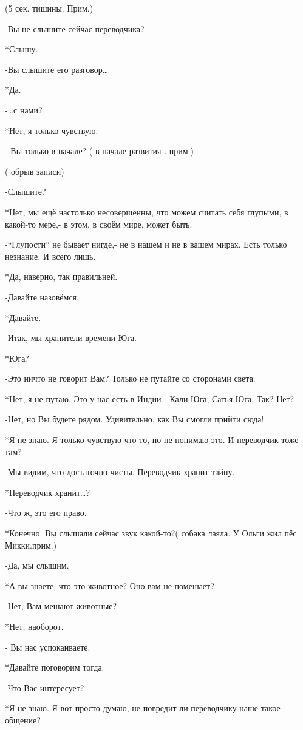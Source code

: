  (5 сек. тишины. Прим.)

-Вы не слышите сейчас переводчика?

*Слышу.

-Вы слышите его разговор… 

*Да.

-…с нами?

*Нет, я только чувствую.

- Вы только в начале? ( в начале развития . прим.)

( обрыв записи)

-Слышите?

*Нет, мы ещё настолько несовершенны, что можем считать себя глупыми, в какой-то мере,- в этом, в своём мире, может быть.

-“Глупости” не бывает нигде,-  не в нашем и не в вашем мирах. Есть только незнание. И всего лишь.

*Да, наверно, так правильней.

-Давайте назовёмся.

*Давайте.

-Итак, мы хранители времени Юга.

*Юга?

-Это ничто не говорит Вам? Только не путайте со сторонами света.

*Нет, я не путаю. Это у нас есть в Индии - Кали Юга, Сатья Юга. Так? Нет?

-Нет, но Вы будете рядом. Удивительно, как Вы смогли прийти сюда!

*Я не знаю. Я только чувствую что то, но не понимаю это. И переводчик тоже там?

-Мы видим, что достаточно чисты. Переводчик хранит тайну.

*Переводчик хранит…?

-Что ж, это его право.

*Конечно. Вы слышали сейчас звук какой-то?( собака лаяла. У Ольги жил пёс Микки.прим.)

-Да, мы слышим.

*А вы знаете, что это животное? Оно вам не помешает?

-Нет, Вам мешают животные?

*Нет, наоборот.

- Вы нас успокаиваете.

*Давайте поговорим тогда.

-Что Вас интересует?

*Я не знаю. Я вот просто думаю, не повредит ли переводчику наше такое общение?

